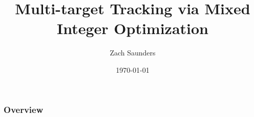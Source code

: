 \documentclass{beamer}
\title[Mutl-target Tracking]{Multi-target Tracking via Mixed Integer Optimization} %
\author{Zach Saunders} %
\institute[ORC] %
{
Operations Research Center \\ %
\medskip
}
\date{\today} %
\begin{document}
\begin{frame}
\titlepage %
\end{frame}

\begin{frame}
\frametitle{Overview} %
\tableofcontents %
\end{frame}


\end{document}
